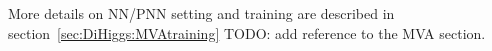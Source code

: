 


More details on NN/PNN setting and training 
are described in section~\ref{sec:DiHiggs:MVAtraining} TODO: add reference to 
the MVA section. 




